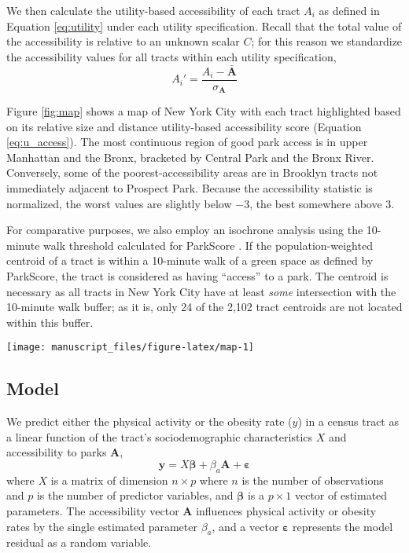 \documentclass[Crown,sageh.bst]{sagej}
\begin{document}
We then calculate the utility-based accessibility of each tract \(A_i\)
as defined in Equation \ref{eq:utility} under each utility
specification. Recall that the total value of the accessibility is
relative to an unknown scalar \(C\); for this reason we standardize the
accessibility values for all tracts within each utility specification,
\begin{equation}\label{eq:v_logged}
A_i' = \frac{A_i - \bar{\boldsymbol{A}}}
            {\sigma_{\boldsymbol{A}}}
\end{equation}

Figure \ref{fig:map} shows a map of New York City with each tract
highlighted based on its relative size and distance utility-based
accessibility score (Equation \ref{eq:u_access}). The most continuous
region of good park access is in upper Manhattan and the Bronx,
bracketed by Central Park and the Bronx River. Conversely, some of the
poorest-accessibility areas are in Brooklyn tracts not immediately
adjacent to Prospect Park. Because the accessibility statistic is
normalized, the worst values are slightly below \(-3\), the best
somewhere above \(3\).

For comparative purposes, we also employ an isochrone analysis using the
10-minute walk threshold calculated for ParkScore \citep{parkscore2019}.
If the population-weighted centroid of a tract is within a 10-minute
walk of a green space as defined by ParkScore, the tract is considered
as having ``access'' to a park. The centroid is necessary as all tracts
in New York City have at least \emph{some} intersection with the
10-minute walk buffer; as it is, only 24 of the 2,102 tract centroids
are not located within this buffer.

\begin{figure*}
\texttt{[image: manuscript\_files/figure-latex/map-1]} \caption{Normalized utility-based park accessibility values in New York City.}\label{fig:map}
\end{figure*}

\hypertarget{model}{%
\subsection{Model}\label{model}}

\label{subsec:model}

We predict either the physical activity or the obesity rate (\(y\)) in a
census tract as a linear function of the tract's sociodemographic
characteristics \(X\) and accessibility to parks \(\boldsymbol{A}\),
\begin{equation}\label{eq:themodel}
 \boldsymbol{y} = X\boldsymbol{\beta} + \beta_{a}\boldsymbol{A} + \boldsymbol{\varepsilon}
\end{equation} where \(X\) is a matrix of dimension \(n\times p\) where
\(n\) is the number of observations and \(p\) is the number of predictor
variables, and \(\boldsymbol{\beta}\) is a \(p\times 1\) vector of
estimated parameters. The accessibility vector \(\boldsymbol{A}\)
influences physical activity or obesity rates by the single estimated
parameter \(\beta_a\), and a vector \(\boldsymbol{\varepsilon}\)
represents the model residual as a random variable.
\end{document}
